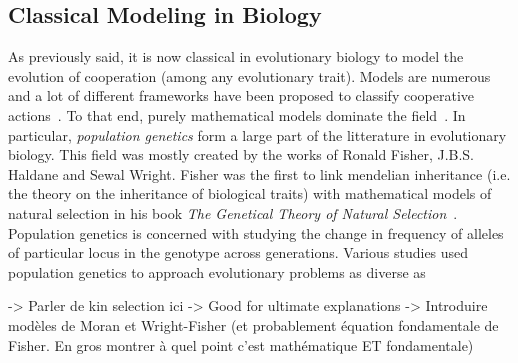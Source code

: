 

  \subsection{Classical Modeling in Biology}

    As previously said, it is now classical in evolutionary biology to model the evolution of cooperation (among any evolutionary trait). Models are numerous and a lot of different frameworks have been proposed to classify cooperative actions~\cite{Dugatkin2002, Sachs2004, Lehmann2006}. To that end, purely mathematical models dominate the field~\cite{Servedio2014}. In particular, \emph{population genetics} form a large part of the litterature in evolutionary biology. This field was mostly created by the works of Ronald Fisher, J.B.S. Haldane and Sewal Wright. Fisher was the first to link mendelian inheritance (i.e. the theory on the inheritance of biological traits) with mathematical models of natural selection in his book \textit{The Genetical Theory of Natural Selection}~\cite{Fisher1930}. Population genetics is concerned with studying the change in frequency of alleles of particular locus in the genotype across generations. Various studies used population genetics to approach evolutionary problems as diverse as 
    
    -> Parler de kin selection ici
    -> Good for ultimate explanations
    -> Introduire modèles de Moran et Wright-Fisher (et probablement équation fondamentale de Fisher. En gros montrer à quel point c'est mathématique ET fondamentale)


